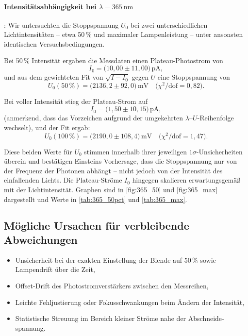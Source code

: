 \paragraph{Intensitätsabhängigkeit bei $\lambda = \SI{365}{\nano\meter}$} :
Wir untersuchten die Stoppspannung $U_0$ bei zwei unterschiedlichen Lichtintensitäten – etwa 50\,\% und maximaler Lampenleistung – unter ansonsten identischen Versuchsbedingungen.

Bei 50\,\% Intensität ergaben die Messdaten einen Plateau-Photostrom von
\begin{equation}
  I_0 = \bigl(10{,}00 \pm 11{,}00\bigr)\,\mathrm{pA},
\end{equation}
und aus dem gewichteten Fit von $\sqrt{I - I_0}$ gegen $U$ eine Stoppspannung von
\begin{equation}
  U_0(50\,\%) = \bigl(2136{,}2 \pm 92{,}0\bigr)\,\mathrm{mV}
  \quad\bigl(\chi^2/\mathrm{dof} = 0{,}82\bigr).
\end{equation}

Bei voller Intensität stieg der Plateau-Strom auf
\begin{equation}
  I_0 = \bigl(1{,}50 \pm 10{,}15\bigr)\,\mathrm{pA},
\end{equation}
(anmerkend, dass das Vorzeichen aufgrund der umgekehrten $\lambda$–$U$-Reihenfolge wechselt), und der Fit ergab:
\begin{equation}
  U_0(100\,\%) = \bigl(2190{,}0 \pm 108{,}4\bigr)\,\mathrm{mV}
  \quad\bigl(\chi^2/\mathrm{dof} = 1{,}47\bigr).
\end{equation}

Diese beiden Werte für $U_0$ stimmen innerhalb ihrer jeweiligen $1\sigma$-Unsicherheiten überein und bestätigen Einsteins Vorhersage, dass die Stoppspannung nur von der Frequenz der Photonen abhängt – nicht jedoch von der Intensität des einfallenden Lichts. Die Plateau-Ströme $I_0$ hingegen skalieren erwartungsgemäß mit der Lichtintensität. Graphen sind in \cref{fig:365_50} und \cref{fig:365_max} dargestellt und Werte in \cref{tab:365_50pct} und \cref{tab:365_max}.

\subsection*{Mögliche Ursachen für verbleibende Abweichungen}
\begin{itemize}
  \item Unsicherheit bei der exakten Einstellung der Blende auf 50\,\% sowie Lampendrift über die Zeit,
  \item Offset-Drift des Photostromverstärkers zwischen den Messreihen,
  \item Leichte Fehljustierung oder Fokusschwankungen beim Ändern der Intensität,
  \item Statistische Streuung im Bereich kleiner Ströme nahe der Abschneide­spannung.
\end{itemize}

